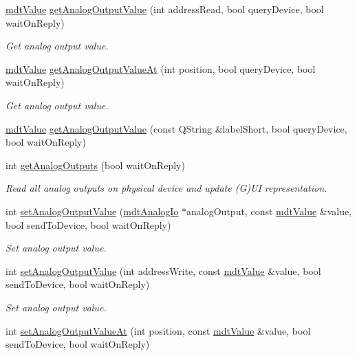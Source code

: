 \begin{DoxyCompactItemize}
\hyperlink{classmdt_value}{mdt\-Value} \hyperlink{classmdt_multi_io_device_ad8b754bf6a4a093eb235f2aeb116cd13}{get\-Analog\-Output\-Value} (int address\-Read, bool query\-Device, bool wait\-On\-Reply)
\begin{DoxyCompactList}\small\item\em Get analog output value. \end{DoxyCompactList}\item 
\hyperlink{classmdt_value}{mdt\-Value} \hyperlink{classmdt_multi_io_device_a3891a61d77b9e5a3b202f84a683c4402}{get\-Analog\-Output\-Value\-At} (int position, bool query\-Device, bool wait\-On\-Reply)
\begin{DoxyCompactList}\small\item\em Get analog output value. \end{DoxyCompactList}\item 
\hyperlink{classmdt_value}{mdt\-Value} \hyperlink{classmdt_multi_io_device_aae44caddee3b138fa1f7b36172c1829c}{get\-Analog\-Output\-Value} (const Q\-String \&label\-Short, bool query\-Device, bool wait\-On\-Reply)
\item 
int \hyperlink{classmdt_multi_io_device_a79b27b1420313f2fee0c5f4d2a8f1735}{get\-Analog\-Outputs} (bool wait\-On\-Reply)
\begin{DoxyCompactList}\small\item\em Read all analog outputs on physical device and update (G)U\-I representation. \end{DoxyCompactList}\item 
int \hyperlink{classmdt_multi_io_device_af58f284bf4310abefa59975664e640d6}{set\-Analog\-Output\-Value} (\hyperlink{classmdt_analog_io}{mdt\-Analog\-Io} $\ast$analog\-Output, const \hyperlink{classmdt_value}{mdt\-Value} \&value, bool send\-To\-Device, bool wait\-On\-Reply)
\begin{DoxyCompactList}\small\item\em Set analog output value. \end{DoxyCompactList}\item 
int \hyperlink{classmdt_multi_io_device_a668fef1da7e91d6889e1fc478c7c6560}{set\-Analog\-Output\-Value} (int address\-Write, const \hyperlink{classmdt_value}{mdt\-Value} \&value, bool send\-To\-Device, bool wait\-On\-Reply)
\begin{DoxyCompactList}\small\item\em Set analog output value. \end{DoxyCompactList}\item 
int \hyperlink{classmdt_multi_io_device_ace3f9d707628ceb6ad7e4bc46c202e32}{set\-Analog\-Output\-Value\-At} (int position, const \hyperlink{classmdt_value}{mdt\-Value} \&value, bool send\-To\-Device, bool wait\-On\-Reply)

\end{DoxyCompactItemize}
